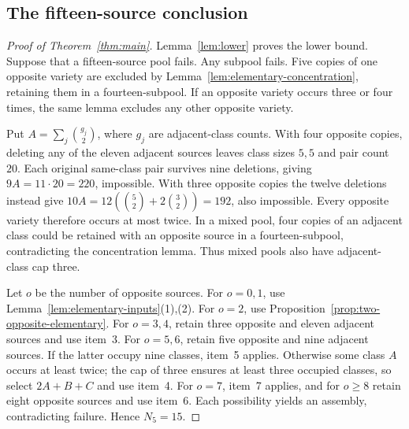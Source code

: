 \subsection{The fifteen-source conclusion}
\begin{proof}[Proof of Theorem~\ref{thm:main}]
Lemma~\ref{lem:lower} proves the lower bound. Suppose that a fifteen-source
pool fails. Any subpool fails. Five copies of one opposite variety are
excluded by Lemma~\ref{lem:elementary-concentration}, retaining them in a
fourteen-subpool. If an opposite variety occurs three or four times, the
same lemma excludes any other opposite variety.

Put $A=\sum_j\binom{g_j}{2}$, where $g_j$ are adjacent-class counts.
With four opposite copies, deleting any of the eleven adjacent sources
leaves class sizes $5,5$ and pair count $20$. Each original same-class
pair survives nine deletions, giving $9A=11\cdot20=220$, impossible.
With three opposite copies the twelve deletions instead give
$10A=12(\binom52+2\binom32)=192$, also impossible.
Every opposite variety therefore occurs at most twice. In a mixed pool,
four copies of an adjacent class could be retained with an opposite source
in a fourteen-subpool, contradicting the concentration lemma. Thus mixed
pools also have adjacent-class cap three.

Let $o$ be the number of opposite sources. For $o=0,1$, use
Lemma~\ref{lem:elementary-inputs}(1),(2). For $o=2$, use
Proposition~\ref{prop:two-opposite-elementary}. For $o=3,4$, retain three
opposite and eleven adjacent sources and use item~3. For $o=5,6$, retain
five opposite and nine adjacent sources. If the latter occupy nine
classes, item~5 applies. Otherwise some class $A$ occurs at least twice;
the cap of three ensures at least three occupied classes, so select
$2A+B+C$ and use item~4. For $o=7$, item~7 applies, and for $o\ge8$
retain eight opposite sources and use item~6. Each possibility yields an
assembly, contradicting failure. Hence $N_5=15$.
\end{proof}

